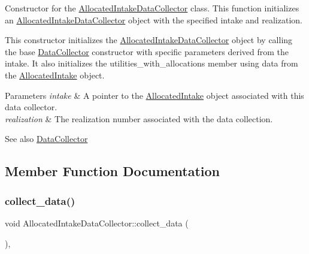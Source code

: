 Constructor for the \mbox{\hyperlink{classAllocatedIntakeDataCollector}{Allocated\+Intake\+Data\+Collector}} class. This function initializes an \mbox{\hyperlink{classAllocatedIntakeDataCollector}{Allocated\+Intake\+Data\+Collector}} object with the specified intake and realization. 

This constructor initializes the \mbox{\hyperlink{classAllocatedIntakeDataCollector}{Allocated\+Intake\+Data\+Collector}} object by calling the base \mbox{\hyperlink{classDataCollector}{Data\+Collector}} constructor with specific parameters derived from the intake. It also initializes the {\ttfamily utilities\+\_\+with\+\_\+allocations} member using data from the {\ttfamily \mbox{\hyperlink{classAllocatedIntake}{Allocated\+Intake}}} object.


\begin{DoxyParams}{Parameters}
{\em intake} & A pointer to the \mbox{\hyperlink{classAllocatedIntake}{Allocated\+Intake}} object associated with this data collector. \\
\hline
{\em realization} & The realization number associated with the data collection.\\
\hline
\end{DoxyParams}
\begin{DoxySeeAlso}{See also}
\mbox{\hyperlink{classDataCollector}{Data\+Collector}} 
\end{DoxySeeAlso}


\subsection{Member Function Documentation}
\mbox{\label{classAllocatedIntakeDataCollector_a06906344679fed5e3d24352e98107537}} 
\subsubsection{\texorpdfstring{collect\+\_\+data()}{collect\_data()}}
{\footnotesize\ttfamily void Allocated\+Intake\+Data\+Collector\+::collect\+\_\+data (\begin{DoxyParamCaption}{ }\end{DoxyParamCaption})\hspace{0.3cm}{\ttfamily [override]}, {\ttfamily [virtual]}}



